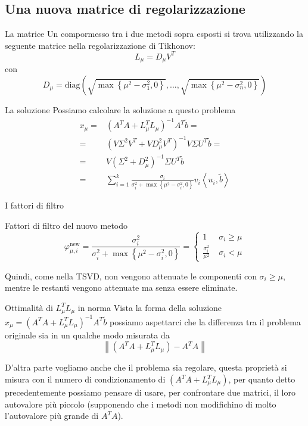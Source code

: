 \documentclass{beamer}
\theoremstyle{plain}
\theoremstyle{definition}
\theoremstyle{remark}
\newcommand{\set}[1]{\left\{#1\right\}}
\newcommand{\pa}[1]{\left(#1\right)}
\newcommand{\ang}[1]{\left<#1\right>}
\newcommand{\norm}[1]{\left\|#1\right\|}
\begin{document}
\subsection{Una nuova matrice di regolarizzazione}

\begin{frame}{La matrice}
  Un compormesso tra i due metodi sopra esposti si trova utilizzando
  la seguente matrice nella regolarizzazione di Tikhonov:
  \[ L_\mu = D _\mu V^T \]
  con
  \[ D_\mu = \mathrm{diag}\pa{ \sqrt{\max\set{\mu ^2 - \sigma _1
        ^2,0}} , ..., \sqrt{\max\set{\mu ^2 - \sigma _n ^2,0}} } \]
\end{frame}

\begin{frame}{La soluzione}
  Possiamo calcolare la soluzione a questo problema
  \begin{align*}
    x_\mu =& \pa{ A^T A + L_\mu^T L_\mu }^{-1} A^T \tilde b = \\
    = & \pa{ V \Sigma ^2 V^T + V D_\mu ^2 V^T} ^{-1} V\Sigma U^T \tilde
    b = \\
    = & V \pa{ \Sigma ^2 + D_\mu ^2 } ^{-1} \Sigma U^T \tilde b \\
    = & \sum _{i=1} ^k \frac{\sigma _i}{\sigma _i ^2 + \max\set{
      \mu ^2 - \sigma _i ^2 ,0}  }  v_i \ang{u_i,\tilde b}
  \end{align*}
\end{frame}

\begin{frame}{I fattori di filtro}
  \begin{block}{Fattori di filtro del nuovo metodo}
    \[ \varphi ^{\text{new}} _{\mu,i} = \frac{\sigma _i ^2}{\sigma _i ^2 + \max\set{
        \mu ^2 - \sigma _i ^2 ,0}  } = \left\{
      \begin{matrix}
        1\; & \sigma _i \ge \mu \\
        \frac{\sigma _i ^2}{\mu ^2} \; & \sigma _i < \mu
      \end{matrix}
    \right. \]
  \end{block}
  \vfill
  
  Quindi, come nella TSVD, non vengono attenuate le componenti con
  $\sigma _i \ge \mu$, mentre le restanti vengono attenuate ma senza
  essere eliminate.
\end{frame}

\begin{frame}{Ottimalità di $L_\mu ^T L_\mu$ in norma}
  Vista la forma della soluzione $x_\mu = \pa{ A^T A + L_\mu^T L_\mu
  }^{-1} A^T \tilde b$ possiamo aspettarci che la differenza tra il
  problema originale sia in un qualche modo misurata da 
  \[ \norm{ \pa{ A^T A + L_\mu^T L_\mu } - A^T A } \]
  
  D'altra parte vogliamo anche che il problema sia regolare, questa
  proprietà si misura con il numero di condizionamento di $\pa{ A^T A
    + L_\mu^T L_\mu }$, per quanto detto precedentemente possiamo
  pensare di usare, per confrontare due matrici, il loro autovalore
  più piccolo (supponendo che i metodi non modifichino di molto
  l'autovalore più grande di $A^T A$).
\end{frame}
\end{document}
